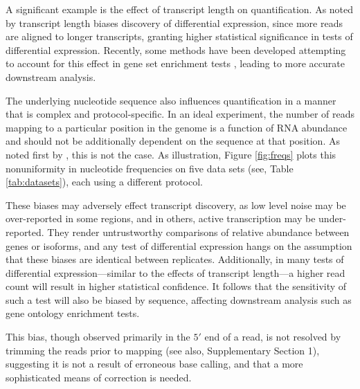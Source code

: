 \documentclass{bioinfo}
\begin{document}
A significant example is the effect of transcript length on quantification.  As
noted by \citet{Oshlack2009} transcript length biases discovery of
differential expression, since more reads are aligned to longer transcripts,
granting higher statistical significance in tests of differential expression.
Recently, some methods have been developed attempting to account for this effect
in gene set enrichment tests \citep{Young2010,Gao2011}, leading to more accurate
downstream analysis.

The underlying nucleotide sequence also influences quantification in a manner
that is complex and protocol-specific. In an ideal experiment, the number of
reads mapping to a particular position in the genome is a function of RNA
abundance and should not be additionally dependent on the sequence at that
position. As noted first by \citet{Dohm2008}, this is not the case.  As
illustration, Figure \ref{fig:freqs} plots this nonuniformity in nucleotide
frequencies on five data sets (see, Table \ref{tab:datasets}), each using a
different protocol.


These biases may adversely effect transcript discovery, as low level noise may
be over-reported in some regions, and in others, active transcription may be
under-reported. They render untrustworthy comparisons of relative abundance
between genes or isoforms, and any test of differential expression hangs on the
assumption that these biases are identical between replicates.  Additionally, in
many tests of differential expression---similar to the effects of transcript
length---a higher read count will result in higher statistical confidence. It
follows that the sensitivity of such a test will also be biased by sequence,
affecting downstream analysis such as gene ontology enrichment tests.

This bias, though observed primarily in the $5'$ end of a read, is not resolved by
trimming the reads prior to mapping \citep{Hansen2010} (see also, Supplementary
Section 1), suggesting it is not a result of erroneous base calling, and that a
more sophisticated means of correction is needed.
\end{document}
